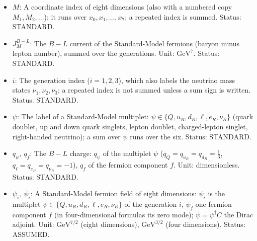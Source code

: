 \documentclass[
  10pt,
]{article}
\begin{document}
\begin{itemize}
  with a frame index are the author's real \(16 \times 16\) matrices of
  the Clifford algebra of signature \((4, 4)\);
  \(\gamma^M = \mathbf{e}_a{}^M\gamma^a\) along a coordinate
  (\(\gamma^{x_0}\), \(\gamma^{x_4}\), \ldots{} the matrices along
  \(x_0\), \(x_4\), \ldots), \(\gamma_M = g_{MN}\gamma^N\);
  \(\gamma^\mu\) the matrices of the four observable directions in
  four-dimensional formulas. Unit: dimensionless. Status: AUTHOR.
\item
  \(M\): A coordinate index of eight dimensions (also with a numbered
  copy \(M_1, M_2, \dots\)): it runs over \(x_0, x_1, \dots, x_7\); a
  repeated index is summed. Status: STANDARD.
\item
  \(J^{B-L}_M\): The \(B - L\) current of the Standard-Model fermions
  (baryon minus lepton number), summed over the generations. Unit:
  \(\mathrm{GeV}^{7}\). Status: STANDARD.
\item
  \(i\): The generation index (\(i = 1, 2, 3\)), which also labels the
  neutrino mass states \(\nu_1, \nu_2, \nu_3\); a repeated index is not
  summed unless a sum sign is written. Status: STANDARD.
\item
  \(\psi\): The label of a Standard-Model multiplet:
  \(\psi \in \{Q, u_R, d_R, \ell, e_R, \nu_R\}\) (quark doublet, up and
  down quark singlets, lepton doublet, charged-lepton singlet,
  right-handed neutrino); a sum over \(\psi\) runs over the six. Status:
  STANDARD.
\item
  \(q_\psi,\ q_f\): The \(B - L\) charge: \(q_\psi\) of the multiplet
  \(\psi\) (\(q_Q = q_{u_R} = q_{d_R} = \frac13\),
  \(q_\ell = q_{e_R} = q_{\nu_R} = -1\)), \(q_f\) of the fermion
  component \(f\). Unit: dimensionless. Status: STANDARD.
\item
  \(\psi_i,\ \bar\psi_i\): A Standard-Model fermion field of eight
  dimensions: \(\psi_i\) is the multiplet
  \(\psi \in \{Q, u_R, d_R, \ell, e_R, \nu_R\}\) of the generation
  \(i\), \(\psi_f\) one fermion component \(f\) (in four-dimensional
  formulas its zero mode); \(\bar\psi = \psi^\dagger C\) the Dirac
  adjoint. Unit: \(\mathrm{GeV}^{7/2}\) (eight dimensions),
  \(\mathrm{GeV}^{3/2}\) (four dimensions). Status: ASSUMED.
\end{itemize}
\end{document}
